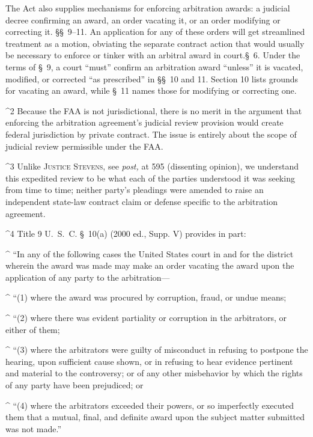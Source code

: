   The Act also supplies mechanisms for enforcing arbitration awards: a
judicial decree confirming an award, an order vacating it, or an order
modifying or correcting it. \S\S~9--11. An application for any of
these orders will get streamlined treatment as a motion, obviating the
separate contract action that would usually be necessary to enforce or
tinker with an arbitral award in court.\footnotemark[3] \S~6. Under the terms
of \S~9, a court ``must'' confirm an arbitration award ``unless''
it is vacated, modified, or corrected ``as prescribed'' in \S\S~10
and 11. Section 10 lists grounds for vacating an award, while \S~11
names those for modifying or correcting one.\footnotemark[4]\newpage 

^2 Because the FAA is not jurisdictional, there is no merit in the
argument that enforcing the arbitration agreement's judicial review
provision would create federal jurisdiction by private contract. The
issue is entirely about the scope of judicial review permissible under
the FAA.

^3 Unlike \textsc{Justice Stevens,} see \emph{post,} at 595 (dissenting
opinion), we understand this expedited review to be what each of the
parties understood it was seeking from time to time; neither party's
pleadings were amended to raise an independent state-law contract claim
or defense specific to the arbitration agreement.

^4 Title 9 U.~S.~C. \S~10(a) (2000 ed., Supp. V) provides in
part:

^   ``In any of the following cases the United States court in and for
the district wherein the award was made may make an order vacating the
award upon the application of any party to the arbitration---\newpage 

^   ``(1) where the award was procured by corruption, fraud, or undue
means;

^   ``(2) where there was evident partiality or corruption in the
arbitrators, or either of them;

^   ``(3) where the arbitrators were guilty of misconduct in refusing to
postpone the hearing, upon sufficient cause shown, or in refusing to
hear evidence pertinent and material to the controversy; or of any other
misbehavior by which the rights of any party have been prejudiced; or

^   ``(4) where the arbitrators exceeded their powers, or so imperfectly
executed them that a mutual, final, and definite award upon the subject
matter submitted was not made.''

